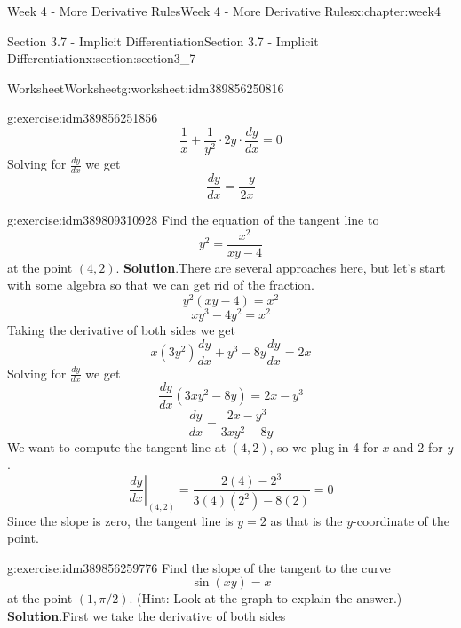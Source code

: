\documentclass[oneside,10pt,]{book}
\newcommand{\blocktitlefont}{\relax}
\numberwithin{equation}{section}
\begin{document}
\begin{chapterptx}{Week 4 - More Derivative Rules}{}{Week 4 - More Derivative Rules}{}{}{x:chapter:week4}
\begin{sectionptx}{Section 3.7 - Implicit Differentiation}{}{Section 3.7 - Implicit Differentiation}{}{}{x:section:section3_7}
\begin{worksheet-subsection}{Worksheet}{}{Worksheet}{}{}{g:worksheet:idm389856250816}
\begin{divisionexercise}{1}{}{}{g:exercise:idm389856251856}
\begin{equation*}
\frac 1x + \frac{1}{y^2}\cdot 2y \cdot \frac{dy}{dx} = 0 
\end{equation*}
Solving for \(\frac{dy}{dx}\) we get%
\begin{equation*}
\frac{dy}{dx} = \frac{-y}{2x} 
\end{equation*}
%
\end{divisionexercise}%
\begin{divisionexercise}{2}{}{}{g:exercise:idm389809310928}%
Find the equation of the tangent line to%
\begin{equation*}
y^2 = \frac{x^2}{xy-4} 
\end{equation*}
at the point \((4,2)\).%
\textbf{\blocktitlefont Solution}.\hypertarget{g:solution:idm389837023600}{}\quad{}There are several approaches here, but let's start with some algebra so that we can get rid of the fraction.%
\begin{equation*}
y^2(xy-4) = x^2 
\end{equation*}
%
\begin{equation*}
xy^3-4y^2 = x^2 
\end{equation*}
Taking the derivative of both sides we get%
\begin{equation*}
x(3y^2)\frac{dy}{dx} + y^3 - 8y\frac{dy}{dx} = 2x 
\end{equation*}
Solving for \(\frac{dy}{dx}\) we get%
\begin{equation*}
\frac{dy}{dx}(3xy^2-8y) = 2x-y^3 
\end{equation*}
%
\begin{equation*}
\frac{dy}{dx} = \frac{2x-y^3}{3xy^2-8y} 
\end{equation*}
We want to compute the tangent line at \((4,2)\), so we plug in 4 for \(x\) and 2 for \(y\).%
\begin{equation*}
\left. \frac{dy}{dx} \right\vert_{(4,2)} = \frac{2(4)-2^3}{3(4)(2^2)-8(2)} = 0 
\end{equation*}
Since the slope is zero, the tangent line is \(y=2\) as that is the \(y\)-coordinate of the point.%
\end{divisionexercise}%
\begin{divisionexercise}{3}{}{}{g:exercise:idm389856259776}%
Find the slope of the tangent to the curve%
\begin{equation*}
\sin (xy) = x 
\end{equation*}
at the point \((1, \pi/2)\). (Hint: Look at the graph to explain the answer.)%
\textbf{\blocktitlefont Solution}.\hypertarget{g:solution:idm389856263392}{}\quad{}First we take the derivative of both sides%

\end{divisionexercise}
\end{worksheet-subsection}
\end{sectionptx}
\end{chapterptx}
\end{document}
